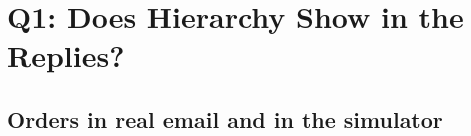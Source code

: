 \chapter{Q1: Does Hierarchy Show in the Replies?}
\label{ch:q1}


\section{Orders in real email and in the simulator}






